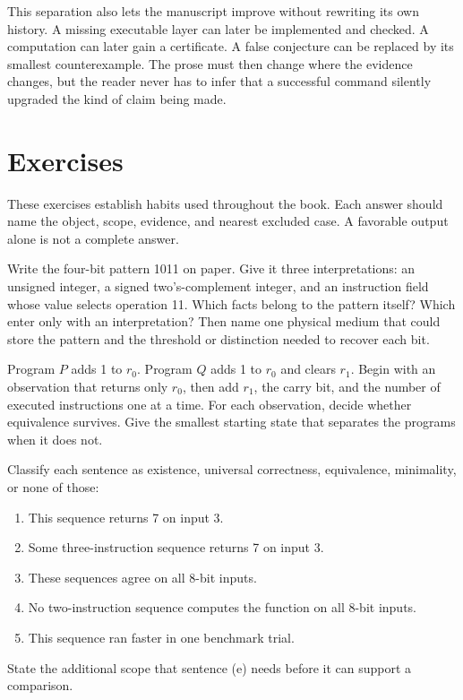 This separation also lets the manuscript improve without rewriting its own
history. A missing executable layer can later be implemented and checked. A
computation can later gain a certificate. A false conjecture can be replaced
by its smallest counterexample. The prose must then change where the evidence
changes, but the reader never has to infer that a successful command silently
upgraded the kind of claim being made.

\section{Exercises}

These exercises establish habits used throughout the book. Each answer should
name the object, scope, evidence, and nearest excluded case. A favorable output
alone is not a complete answer.

\begin{tryit}[title={\iconTryIt\ Reproduce: follow the interpretation stack}]
Write the four-bit pattern 1011 on paper. Give it three interpretations: an
unsigned integer, a signed two's-complement integer, and an instruction field
whose value selects operation 11. Which facts belong to the pattern itself?
Which enter only with an interpretation? Then name one physical medium that
could store the pattern and the threshold or distinction needed to recover
each bit.
\end{tryit}

\begin{tryit}[title={\iconTryIt\ Break: enlarge the observation}]
Program \(P\) adds 1 to \(r_0\). Program \(Q\) adds 1 to \(r_0\) and clears \(r_1\).
Begin with an observation that returns only \(r_0\), then add \(r_1\), the carry
bit, and the number of executed instructions one at a time. For each
observation, decide whether equivalence survives. Give the smallest starting
state that separates the programs when it does not.
\end{tryit}

\begin{tryit}[title={\iconTryIt\ Classify the claim}]
Classify each sentence as existence, universal correctness, equivalence,
minimality, or none of those:
\begin{enumerate}
\item[(a)] This sequence returns 7 on input 3.
\item[(b)] Some three-instruction sequence returns 7 on input 3.
\item[(c)] These sequences agree on all 8-bit inputs.
\item[(d)] No two-instruction sequence computes the function on all 8-bit inputs.
\item[(e)] This sequence ran faster in one benchmark trial.
\end{enumerate}
State the additional scope that sentence (e) needs before it can support a
comparison.
\end{tryit}

